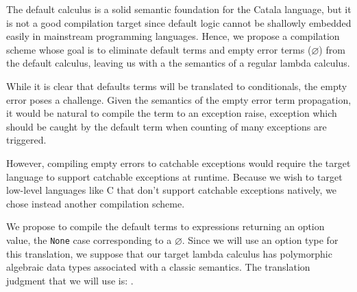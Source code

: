 \documentclass[11pt,a4paper]{article}
\newcommand{\synvar}[1]{\ensuremath{#1}}
\newcommand{\synemptydefault}{\synvar{\varnothing}}
\newcommand{\compctx}[1]{\textcolor{yellow!70!black}{\ensuremath{#1}}}
\newcommand{\compiles}{\;\ensuremath{\compctx{\rightrightarrows}}\;}
\begin{document}
The default calculus is a solid semantic foundation for the Catala language,
but it is not a good compilation target since default logic cannot be shallowly
embedded easily in mainstream programming languages. Hence, we propose a
compilation scheme whose goal is to eliminate default terms and empty error 
terms (\synemptydefault) from the default calculus, leaving us with a the semantics of a
regular lambda calculus.

While it is clear that defaults terms will be translated to conditionals,
the empty error poses a challenge. Given the semantics of the empty error term
propagation, it would be natural to compile the term to an exception raise, 
exception which should be caught by the default term when counting of many 
exceptions are triggered.

However, compiling empty errors to catchable exceptions would require the 
target language to support catchable exceptions at runtime. Because we wish 
to target low-level languages like C that don't support catchable exceptions 
natively, we chose instead another compilation scheme.

We propose to compile the default terms to expressions returning an option 
value, the \verb|None| case corresponding to a \synemptydefault. 
Since we will use an option type for this translation, we suppose that our 
target lambda calculus has polymorphic algebraic data types associated with 
a classic semantics. The translation judgment that we will use is: 
\fbox{\synvar{e}\compiles\synvar{e'}}. 
\end{document}
